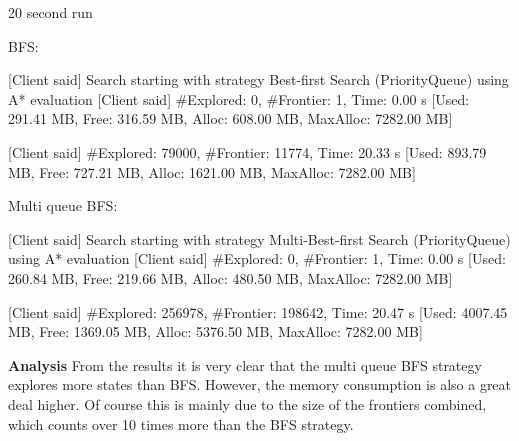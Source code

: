 \documentclass[Main]{subfiles}
\begin{document}
20 second run 

BFS:

[Client said] Search starting with strategy Best-first Search (PriorityQueue) using A* evaluation
[Client said] #Explored:    0, #Frontier:   1, Time: 0.00 s     [Used: 291.41 MB, Free: 316.59 MB, Alloc: 608.00 MB, MaxAlloc: 7282.00 MB]

[Client said] #Explored: 79000, #Frontier: 11774, Time: 20.33 s     [Used: 893.79 MB, Free: 727.21 MB, Alloc: 1621.00 MB, MaxAlloc: 7282.00 MB]


Multi queue BFS:

[Client said] Search starting with strategy Multi-Best-first Search (PriorityQueue) using A* evaluation
[Client said] #Explored:    0, #Frontier:   1, Time: 0.00 s     [Used: 260.84 MB, Free: 219.66 MB, Alloc: 480.50 MB, MaxAlloc: 7282.00 MB]

[Client said] #Explored: 256978, #Frontier: 198642, Time: 20.47 s   [Used: 4007.45 MB, Free: 1369.05 MB, Alloc: 5376.50 MB, MaxAlloc: 7282.00 MB]


\textbf{Analysis}
From the results it is very clear that the multi queue BFS strategy explores more states than BFS. However, the memory consumption is also a great deal higher. Of course this is mainly due to the size of the frontiers combined, which counts over 10 times more than the BFS strategy. 








\end{document}
